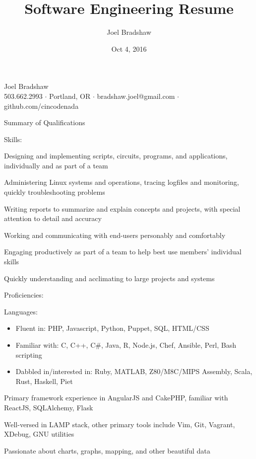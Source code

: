 \documentclass[letterpaper,10pt]{article}
\begin{document}
\title{Software Engineering Resume}
\author{Joel Bradshaw}
\date{Oct 4, 2016}
\begin{center}
{\Huge Joel Bradshaw}\\
\vskip 2pt
{\large 503.662.2993 \ensuremath{\cdot} Portland, OR \ensuremath{\cdot} bradshaw.joel@gmail.com \ensuremath{\cdot} github.com/cincodenada}
\end{center}
\vskip -8pt
\begin{res_section}{Summary of Qualifications}
\begin{res_subsection}{Skills:}
  \item Designing and implementing scripts, circuits, programs, and applications, individually and as part of a team
  \item Administering Linux systems and operations, tracing logfiles and monitoring, quickly troubleshooting problems
  \item Writing reports to summarize and explain concepts and projects, with special attention to detail and accuracy
  \item Working and communicating with end-users personably and comfortably
  \item Engaging productively as part of a team to help best use members' individual skills
  \item Quickly understanding and acclimating to large projects and systems
\end{res_subsection}
\begin{res_subsection}{Proficiencies:}
  \item Languages:
  \def \multicolsep {0pt}
  \setlength{\columnsep}{-8pt}
  \begin{itemize}
    \item Fluent in: PHP, Javascript, Python, Puppet, SQL, HTML/CSS
    \item Familiar with: C, C++, C\#, Java, R, Node.js, Chef, Ansible, Perl, Bash scripting
    \item Dabbled in/interested in: Ruby, MATLAB, Z80/M8C/MIPS Assembly, Scala, Rust, Haskell, Piet
  \end{itemize}
  \item Primary framework experience in AngularJS and CakePHP, familiar with ReactJS, SQLAlchemy, Flask
  \item Well-versed in LAMP stack, other primary tools include Vim, Git, Vagrant, XDebug, GNU utilities
  \item Passionate about charts, graphs, mapping, and other beautiful data
\end{res_subsection}
\end{res_section}
\end{document}
